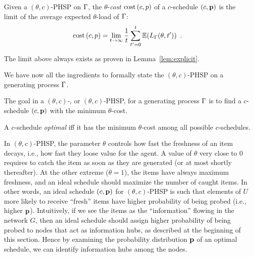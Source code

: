 \begin{definition}
	Given a $(\theta,c)$-PHSP on $\Gamma$, the $\theta$-\emph{cost} $\text{cost}\left( c,p \right)$
	of a $c$-schedule $(c,\mathbf{p})$ is the limit of the average expected
	$\theta$-load of $\Gamma$:
	\[
		\text{cost}\left( c,p \right)=\lim\limits_{t\rightarrow\infty}\frac{1}{t}\sum_{t'=0}^{t}\mathbb{E}(L_\Gamma(\theta,t'))\enspace.
	\]
\end{definition}
The limit above always exists as proven in Lemma~\ref{lem:explicit}.

We have now all the ingredients to formally state the $(\theta,c)$-PHSP on a
generating process $\Gamma$.

\begin{definition}[\probname]\label{def:phsp}
	The goal in a $(\theta,c)$-{\probname}, or $(\theta,c)$-PHSP, for a
	generating process $\Gamma$ is to find a $c$-schedule $(c,\mathbf{p})$ with the
	minimum $\theta$-cost.

	A $c$-schedule \emph{optimal} iff it has the minimum $\theta$-cost among all
	possible $c$-schedules.
\end{definition}

In $(\theta,c)$-PHSP, the parameter $\theta$ controls how fast the freshness of
an item decays, i.e., how fast they loose value for the agent. A value of
$\theta$ very close to $0$ requires to catch the item  as soon as they are
generated (or at most shortly thereafter). At the other extreme ($\theta=1$),
the items have always maximum freshness, and an ideal schedule should maximize
the number of caught items.  In other words, an ideal schedule $(c,\mathbf{p})$ for
$(\theta, c)$-PHSP is such that elements of $U$ more likely to receive ``fresh''
items have higher probability of being probed (i.e., higher $\mathbf{p}$). Intuitively,
if we see the items as the ``information'' flowing in the network $G$, then an
ideal schedule should assign higher probability of being probed to nodes that
act as information hubs, as described at the beginning of this section. Hence by
examining the probability distribution $\mathbf{p}$ of an optimal schedule, we can
identify information hubs among the nodes.
